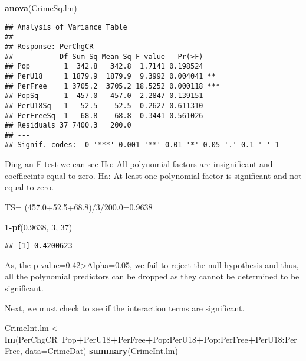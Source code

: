 \documentclass[]{article}
\newenvironment{Shaded}{\begin{snugshade}}{\end{snugshade}}
\newcommand{\KeywordTok}[1]{\textcolor[rgb]{0.13,0.29,0.53}{\textbf{#1}}}
\newcommand{\DataTypeTok}[1]{\textcolor[rgb]{0.13,0.29,0.53}{#1}}
\newcommand{\DecValTok}[1]{\textcolor[rgb]{0.00,0.00,0.81}{#1}}
\newcommand{\FloatTok}[1]{\textcolor[rgb]{0.00,0.00,0.81}{#1}}
\newcommand{\StringTok}[1]{\textcolor[rgb]{0.31,0.60,0.02}{#1}}
\newcommand{\OperatorTok}[1]{\textcolor[rgb]{0.81,0.36,0.00}{\textbf{#1}}}
\newcommand{\NormalTok}[1]{#1}
\begin{document}
\begin{Shaded}
\begin{Highlighting}[]
\KeywordTok{anova}\NormalTok{(CrimeSq.lm)}
\end{Highlighting}
\end{Shaded}

\begin{verbatim}
## Analysis of Variance Table
## 
## Response: PerChgCR
##           Df Sum Sq Mean Sq F value   Pr(>F)    
## Pop        1  342.8   342.8  1.7141 0.198524    
## PerU18     1 1879.9  1879.9  9.3992 0.004041 ** 
## PerFree    1 3705.2  3705.2 18.5252 0.000118 ***
## PopSq      1  457.0   457.0  2.2847 0.139151    
## PerU18Sq   1   52.5    52.5  0.2627 0.611310    
## PerFreeSq  1   68.8    68.8  0.3441 0.561026    
## Residuals 37 7400.3   200.0                     
## ---
## Signif. codes:  0 '***' 0.001 '**' 0.01 '*' 0.05 '.' 0.1 ' ' 1
\end{verbatim}

Ding an F-test we can see Ho: All polynomial factors are insignificant
and coefficeints equal to zero. Ha: At least one polynomial factor is
significant and not equal to zero.

TS= (457.0+52.5+68.8)/3/200.0=0.9638

\begin{Shaded}
\begin{Highlighting}[]
\DecValTok{1}\OperatorTok{-}\KeywordTok{pf}\NormalTok{(}\FloatTok{0.9638}\NormalTok{, }\DecValTok{3}\NormalTok{, }\DecValTok{37}\NormalTok{)}
\end{Highlighting}
\end{Shaded}

\begin{verbatim}
## [1] 0.4200623
\end{verbatim}

As, the p-value=0.42\textgreater{}Alpha=0.05, we fail to reject the null
hypothesis and thus, all the polynomial predictors can be dropped as
they cannot be determined to be significant.

Next, we must check to see if the interaction terms are significant.

\begin{Shaded}
\begin{Highlighting}[]
\NormalTok{CrimeInt.lm <-}\StringTok{ }\KeywordTok{lm}\NormalTok{(PerChgCR}\OperatorTok{~}\NormalTok{Pop}\OperatorTok{+}\NormalTok{PerU18}\OperatorTok{+}\NormalTok{PerFree}\OperatorTok{+}\NormalTok{Pop}\OperatorTok{:}\NormalTok{PerU18}\OperatorTok{+}\NormalTok{Pop}\OperatorTok{:}\NormalTok{PerFree}\OperatorTok{+}\NormalTok{PerU18}\OperatorTok{:}\NormalTok{PerFree, }\DataTypeTok{data=}\NormalTok{CrimeDat)}
\KeywordTok{summary}\NormalTok{(CrimeInt.lm)}
\end{Highlighting}
\end{Shaded}
\end{document}
